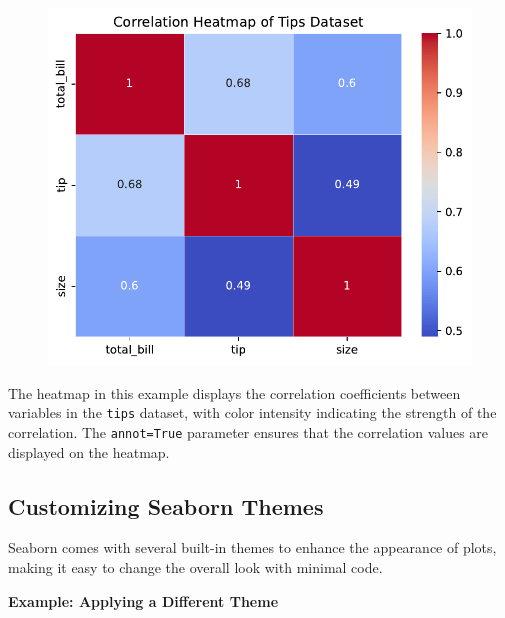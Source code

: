 \documentclass[
  letterpaper,
  DIV=11,
  numbers=noendperiod]{scrreprt}
\begin{document}
\begin{figure}[H]

{\centering \includegraphics{15_Data_Vis_files/figure-pdf/cell-16-output-1.pdf}

}

\end{figure}

The heatmap in this example displays the correlation coefficients
between variables in the \texttt{tips} dataset, with color intensity
indicating the strength of the correlation. The \texttt{annot=True}
parameter ensures that the correlation values are displayed on the
heatmap.

\hypertarget{customizing-seaborn-themes}{%
\subsection{Customizing Seaborn
Themes}\label{customizing-seaborn-themes}}

Seaborn comes with several built-in themes to enhance the appearance of
plots, making it easy to change the overall look with minimal code.

\textbf{Example: Applying a Different Theme}
\end{document}
